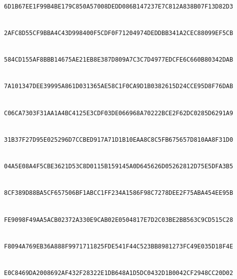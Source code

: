 \begingroup\scriptsize
\noindent{}\\
\nolinkurl{6D1B67EE1F99B4BE179C850A57008DEDD086B147237E7C812A838B07F13D82D3}\par
\smallskip
\noindent{}\\
\nolinkurl{2AFC8D55CF9BBA4C43D998400F5CDF0F71204974DEDDBB341A2CEC88099EF5CB}\par
\smallskip
\noindent{}\\
\nolinkurl{584CD155AF8BBB14675AE21EB8E387D809A7C3C7D4977EDCFE6C660B80342DAB}\par
\smallskip
\noindent{}\\
\nolinkurl{7A101347DEE39995A861D031365AE58C1F0CA9D1B0382615D24CCE95D8F76DAB}\par
\smallskip
\noindent{}\\
\nolinkurl{C06CA7303F31AA1A4BC4125E3CDF03DE066968A70222BCE2F62DC0285D6291A9}\par
\smallskip
\noindent{}\\
\nolinkurl{31B37F27D95E025296D7CCBED917A71D1B10EAA8C8C5FB675657D810AA8F31D0}\par
\smallskip
\noindent{}\\
\nolinkurl{04A5E08A4F5CBE3621D53C8D0115B159145A0D645626D05262812D75E5DFA3B5}\par
\smallskip
\noindent{}\\
\nolinkurl{8CF389D88BA5CF657506BF1ABCC1FF234A1586F98C7278DEE2F75ABA454EE95B}\par
\smallskip
\noindent{}\\
\nolinkurl{FE9098F49AA5ACB02372A330E9CAB02E0504817E7D2C03BE2BB563C9CD515C28}\par
\smallskip
\noindent{}\\
\nolinkurl{F8094A769EB36A888F9971711825FDE541F44C523BB8981273FC49E035D18F4E}\par
\smallskip
\noindent{}\\
\nolinkurl{E0C8469DA2008692AF432F28322E1DB648A1D5DC0432D1B0042CF2948CC20D02}\par
